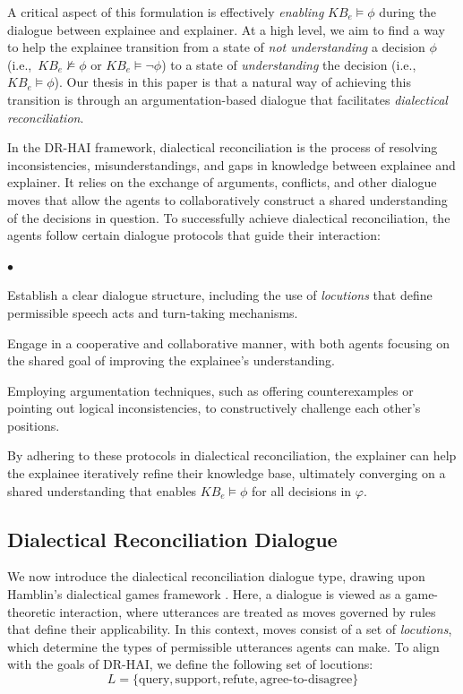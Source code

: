 \documentclass[letterpaper]{article} %
\newcommand{\squishlist}{
\begin{list}{$\bullet$}{ 
    \setlength{\itemsep}{1pt}
    \setlength{\parsep}{0pt}
    \setlength{\topsep}{1.5pt}
    \setlength{\partopsep}{0pt}
    \setlength{\leftmargin}{1em}
    \setlength{\labelwidth}{1em}
    \setlength{\labelsep}{0.5em} } }
\newcommand{\squishend}{\end{list}  }
\begin{document}
A critical aspect of this formulation is effectively \textit{enabling} $KB_e \models \phi$ during the dialogue between explainee and explainer. At a high level, we aim to find a way to help the explainee transition from a state of \textit{not understanding} a decision $\phi$ (i.e.,~$KB_e \not \models \phi$ or $KB_e \models \neg \phi$) to a state of \textit{understanding} the decision (i.e.,~$KB_e \models \phi$). Our thesis in this paper is that a natural way of achieving this transition is through an argumentation-based dialogue that facilitates \emph{dialectical reconciliation}.

In the DR-HAI framework, dialectical reconciliation is the process of resolving inconsistencies, misunderstandings, and gaps in knowledge between explainee and explainer. It relies on the exchange of arguments, conflicts, and other dialogue moves that allow the agents to collaboratively construct a shared understanding of the decisions in question. To successfully achieve dialectical reconciliation, the agents follow certain dialogue protocols that guide their interaction:

\squishlist
\item Establish a clear dialogue structure, including the use of \emph{locutions} that define permissible speech acts and turn-taking mechanisms.
\item Engage in a cooperative and collaborative manner, with both agents focusing on the shared goal of improving the explainee's understanding.
\item Employing argumentation techniques, such as offering counterexamples or pointing out logical inconsistencies, to constructively challenge each other's positions.

\squishend

By adhering to these protocols in dialectical reconciliation, the explainer can help the explainee iteratively refine their knowledge base, ultimately converging on a shared understanding that enables $KB_e \models \phi$ for all decisions in $\varphi$. 

\subsection{Dialectical Reconciliation Dialogue}

We now introduce the dialectical reconciliation dialogue type, drawing upon Hamblin's dialectical games framework \cite{hamblin1970fallacies,hamblin1971mathematical}. Here, a dialogue is viewed as a game-theoretic interaction, where utterances are treated as moves governed by rules that define their applicability. In this context, moves consist of a set of \emph{locutions}, which determine the types of permissible utterances agents can make. To align with the goals of DR-HAI, we define the following set of locutions:
\begin{equation}
L = \{\mbox{query}, \mbox{support}, \mbox{refute}, \mbox{agree}\text{-}\mbox{to}\text{-}\mbox{disagree} \}
\end{equation}
\end{document}
